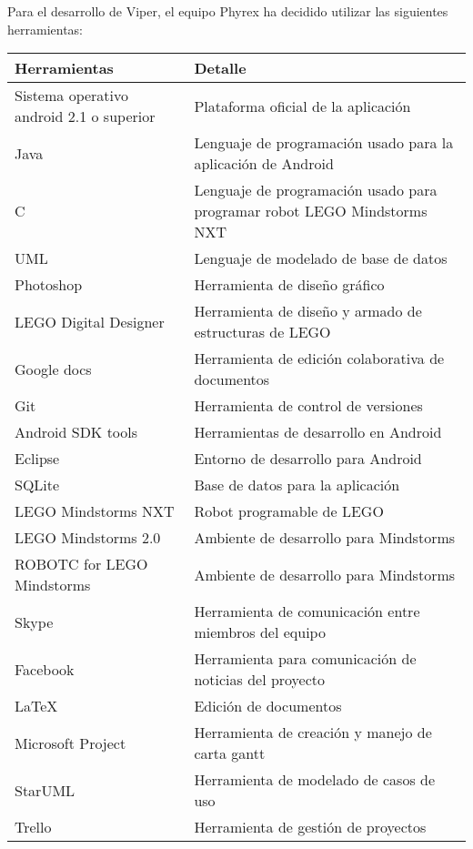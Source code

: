 Para el desarrollo de Viper, el equipo Phyrex ha decidido utilizar las siguientes herramientas:

\begin{table}[H]
  \centering
  \begin{tabular}{|p{5cm}|p{9cm}|}\hline
    Herramientas & Detalle \\\hline\hline
    Sistema operativo android 2.1 o superior & Plataforma oficial de la aplicaci\'on\\
    Java & Lenguaje de programaci\'on usado para la aplicaci\'on de Android\\
    C & Lenguaje de programaci\'on usado para programar robot LEGO Mindstorms NXT\\
    UML & Lenguaje de modelado de base de datos\\
    Photoshop  & Herramienta de dise\~no gr\'afico\\
    LEGO Digital Designer & Herramienta de dise\~no y armado de estructuras de LEGO\\
    Google docs & Herramienta de edici\'on colaborativa de documentos\\
    Git & Herramienta de control de versiones\\
    Android SDK tools & Herramientas de desarrollo en Android\\
    Eclipse & Entorno de desarrollo para Android\\
    SQLite & Base de datos para la aplicaci\'on\\
    LEGO Mindstorms NXT & Robot programable de LEGO\\
    LEGO Mindstorms 2.0 & Ambiente de desarrollo para Mindstorms\\
    ROBOTC for LEGO Mindstorms & Ambiente de desarrollo para Mindstorms\\
    Skype & Herramienta de comunicaci\'on entre miembros del equipo\\
    Facebook & Herramienta para comunicaci\'on de noticias del proyecto\\
    \LaTeX & Edici\'on de documentos\\
    Microsoft Project & Herramienta de creaci\'on y manejo de carta gantt\\
    StarUML & Herramienta de modelado de casos de uso\\
    Trello & Herramienta de gesti\'on de proyectos\\\hline
  \end{tabular}
\end{table}

